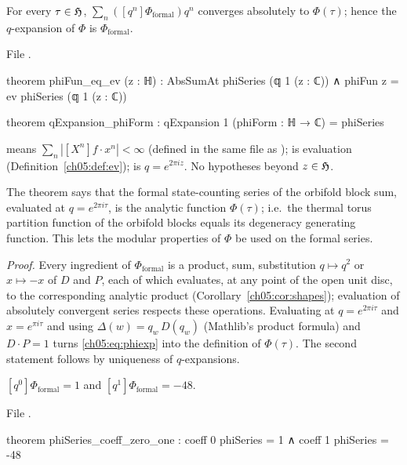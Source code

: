 \begin{theorem}\label{ch05:thm:phiev}
For every $\tau\in\mathfrak{H}$, $\sum_n([q^n]\Phi_{\mathrm{formal}})q^n$ converges absolutely to $\Phi(\tau)$;
hence the $q$-expansion of $\Phi$ is $\Phi_{\mathrm{formal}}$.
\end{theorem}
\noindent File .
\begin{leancode}
theorem phiFun_eq_ev (z : ℍ) : AbsSumAt phiSeries (𝕢 1 (z : ℂ)) ∧ phiFun z = ev phiSeries (𝕢 1 (z : ℂ))

theorem qExpansion_phiForm : qExpansion 1 (phiForm : ℍ → ℂ) = phiSeries
\end{leancode}
\begin{dictionary}
 means $\sum_n|[X^n]f\cdot x^n|<\infty$ (defined in the same file as
);  is evaluation (Definition~\ref{ch05:def:ev});
 is $q = e^{2\pi iz}$. No hypotheses beyond $z\in\mathfrak{H}$.
\end{dictionary}

\begin{physics}
The theorem says that the formal state-counting series of the orbifold block sum, evaluated at $q=e^{2\pi i\tau}$, is the analytic function $\Phi(\tau)$; i.e.\ the thermal torus partition function of the orbifold blocks equals its degeneracy generating function. This lets the modular properties of $\Phi$ be used on the formal series.
\end{physics}
\noindent\emph{Proof.} Every ingredient of $\Phi_{\mathrm{formal}}$ is a product, sum, substitution
$q\mapsto q^2$ or $x\mapsto-x$ of $D$ and $P$, each of which evaluates, at any point of the open unit
disc, to the corresponding analytic product (Corollary~\ref{ch05:cor:shapes}); evaluation of absolutely
convergent series respects these operations. Evaluating at $q = e^{2\pi i\tau}$ and $x = e^{\pi i\tau}$ and using
$\Delta(w) = q_w\,D(q_w)$ (Mathlib's product formula) and $D\cdot P = 1$ turns \eqref{ch05:eq:phiexp} into
the definition of $\Phi(\tau)$. The second statement follows by uniqueness of $q$-expansions.

\begin{proposition}\label{ch05:prop:phicoeff}
$[q^0]\Phi_{\mathrm{formal}} = 1$ and $[q^1]\Phi_{\mathrm{formal}} = -48$.
\end{proposition}
\noindent File .
\begin{leancode}
theorem phiSeries_coeff_zero_one : coeff 0 phiSeries = 1 ∧ coeff 1 phiSeries = -48
\end{leancode}


